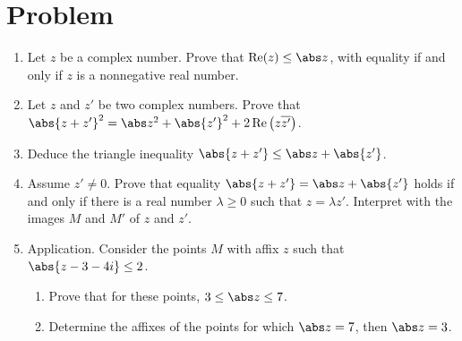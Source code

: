 \section{Problem}
\begin{problem}
\begin{enumerate}
\item Let $z$ be a complex number. Prove that $\operatorname{Re}(z)\le\abs z$, with equality if and only if $z$ is a nonnegative real number.
\item Let $z$ and $z'$ be two complex numbers. Prove that $\abs{z+z'}^2=\abs z^2+\abs{z'}^2+2\operatorname{Re}\left(z\overline{z'}\right)$.
\item Deduce the triangle inequality $\abs{z+z'}\le\abs z+\abs{z'}$.
\item Assume $z'\neq0$. Prove that equality $\abs{z+z'}=\abs z+\abs{z'}$ holds if and only if there is a real number $\lambda\ge0$ such that $z=\lambda z'$. Interpret with the images $M$ and $M'$ of $z$ and $z'$.
\item Application. Consider the points $M$ with affix $z$ such that $\abs{z-3-4i}\le2$.
\begin{enumerate}
\item Prove that for these points, $3\le\abs z\le7$.
\item Determine the affixes of the points for which $\abs z=7$, then $\abs z=3$.
\end{enumerate}
\end{enumerate}
\end{problem}
